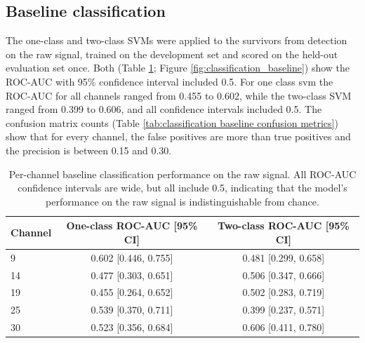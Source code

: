 \documentclass[ %
                    author={Rzan Alkabier},
                    supervisor={Dr. Zahraa Abdallah},
                    degree={MSc},
                     title={Denoising Extracellular Recording for Spike Detection and Classification on Single Channels},
                    subtitle={Does denoising improve detection and classification performance?},
                      type={},
                      year={2026}]{dissertation}
\begin{document}
\subsection{Baseline classification}
The one-class and two-class SVMs were applied to the survivors from detection on the raw signal, trained on the development set and scored on the held-out evaluation set once.  Both (Table \ref{tab:classification baseline}; Figure \ref{fig:classification_baseline}) show the ROC-AUC with 95\% confidence interval included 0.5. For one class svm the ROC-AUC for all channels ranged from 0.455 to 0.602, while the two-class SVM ranged from 0.399 to 0.606, and all confidence intervals included 0.5. The confusion matrix counts (Table \ref{tab:classification baseline confusion metrics}) show that for every channel, the false positives are more than true positives and the precision is between 0.15 and 0.30. 
\begin{table}[H]
    \centering
    \begin{tabular}{lcc}
    \toprule
    Channel &  One-class ROC-AUC [95\% CI] & Two-class ROC-AUC [95\% CI] \\
    \midrule
    9 & 0.602 [0.446, 0.755] & 0.481 [0.299, 0.658] \\
    14 & 0.477 [0.303, 0.651] & 0.506 [0.347, 0.666] \\
    19 & 0.455 [0.264, 0.652] & 0.502 [0.283, 0.719] \\
    25 & 0.539 [0.370, 0.711] & 0.399 [0.237, 0.571] \\
    30 & 0.523 [0.356, 0.684] & 0.606 [0.411, 0.780] \\
    \bottomrule
    \end{tabular}
    \caption{Per-channel baseline classification performance on the raw signal. All ROC-AUC confidence intervals are wide, but all include 0.5, indicating that the model's performance on the raw signal is indistinguishable from chance.}
    \label{tab:classification baseline}
\end{table}
\end{document}

